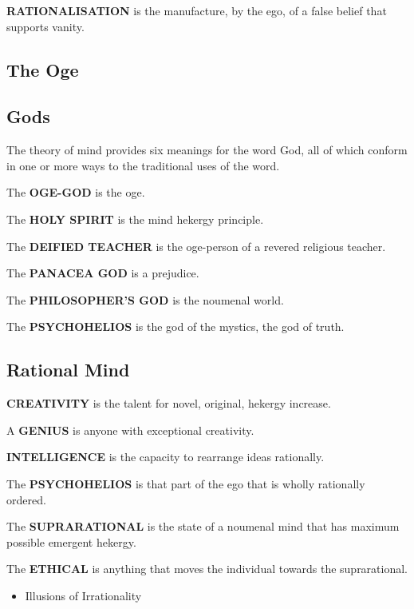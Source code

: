 \documentclass[11pt]{article}
\begin{document}
{{{{\textbf{RATIONALISATION} is the manufacture, by the ego, of a false
belief that supports vanity.

\subsection{The Oge}
\label{sec-2.2}

\subsection{Gods}
\label{sec-2.3}

The theory of mind provides six meanings for the word God,
all of which conform in one or more ways to the traditional
uses of the word.

The \textbf{OGE-GOD} is the oge.

The \textbf{HOLY SPIRIT} is the mind hekergy principle.

The \textbf{DEIFIED TEACHER} is the oge-person of a revered religious teacher.

The \textbf{PANACEA GOD} is a prejudice.

The \textbf{PHILOSOPHER'S GOD} is the noumenal world.

The \textbf{PSYCHOHELIOS} is the god of the mystics, the god of truth.

\subsection{Rational Mind}
\label{sec-2.4}


\textbf{CREATIVITY} is the talent for novel, original, hekergy increase.

A \textbf{GENIUS} is anyone with exceptional creativity.

\textbf{INTELLIGENCE} is the capacity to rearrange ideas rationally.

The \textbf{PSYCHOHELIOS} is that part of the ego that is wholly
rationally ordered.

The \textbf{SUPRARATIONAL} is the state of a noumenal mind that 
has maximum possible emergent hekergy.

The \textbf{ETHICAL} is anything that moves the individual towards
the suprarational.

\begin{itemize}

\item Illusions of Irrationality\\
\label{sec-2.4.1}


\end{itemize}}}}}
\end{document}
